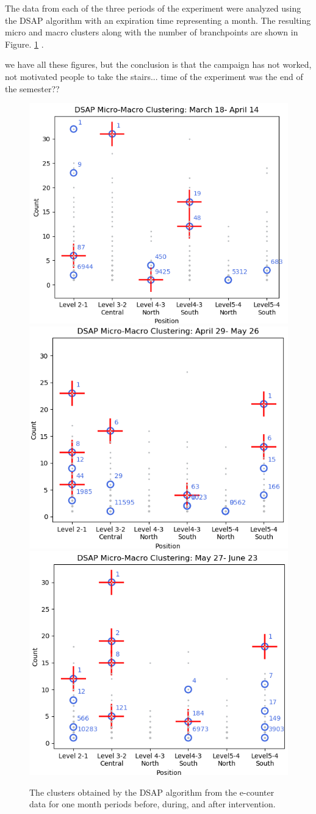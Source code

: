 The data from each of the three periods of the experiment were analyzed using the DSAP algorithm with an expiration time representing a month. The resulting micro and macro clusters along with the number of branchpoints are shown in Figure. \ref{dsap3mon} .

we have all these figures, but the conclusion is that the campaign has not worked, not motivated people to take the stairs... time of the experiment was the end of the semester??

\begin{figure}[!t]
    \centering
    \includegraphics[width=.47\textwidth]{image/Chapters/Chapter6/BeforeInte1month.png}
    \includegraphics[width=.47\textwidth]{image/Chapters/Chapter6/duringInte1month.png}
    \includegraphics[width=.47\textwidth]{image/Chapters/Chapter6/afterInte1month.png}
    \caption{The clusters obtained by the DSAP algorithm from the e-counter data for one month periods before, during, and after intervention.}
    \label{dsap3mon}
\end{figure}


